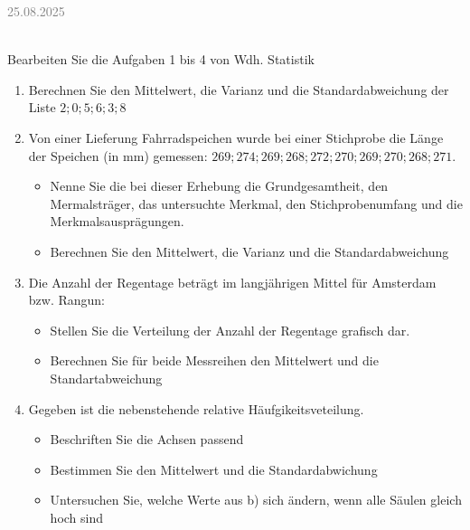 \documentclass[11pt,a4paper,oneside]{article}
\newcommand{\lessondate}[1]{
	\noindent\hfill\textcolor{gray}{\textsc{#1}} \\
	\vspace{0.5cm}
}
\begin{document}
	\newpage 
	\lessondate{25.08.2025}\\
	
	\begin{aufgabe}{Bearbeiten Sie die Aufgaben 1 bis 4 von Wdh. Statistik}
		\begin{enumerate}
			\item Berechnen Sie den Mittelwert, die Varianz und die Standardabweichung der Liste ${2; 0; 5; 6; 3; 8}$
			\item Von einer Lieferung Fahrradspeichen wurde bei einer Stichprobe die Länge der Speichen (in mm) gemessen: ${269; 274; 269; 268; 272; 270; 269; 270; 268; 271}$. 
			\begin{itemize}
				\item Nenne Sie die bei dieser Erhebung die Grundgesamtheit, den Mermalsträger, das untersuchte Merkmal, den Stichprobenumfang und die Merkmalsausprägungen. 
				\item Berechnen Sie den Mittelwert, die Varianz und die Standardabweichung 
			\end{itemize}
			\item Die Anzahl der Regentage beträgt im langjährigen Mittel für Amsterdam bzw. Rangun: 
			\begin{itemize}
				\item Stellen Sie die Verteilung der Anzahl der Regentage grafisch dar. 
				\item Berechnen Sie für beide Messreihen den Mittelwert und die Standartabweichung
			\end{itemize}
			\item Gegeben ist die nebenstehende relative Häufgikeitsveteilung.
			\begin{itemize}
				\item Beschriften Sie die Achsen passend 
				\item Bestimmen Sie den Mittelwert und die Standardabwichung 
				\item Untersuchen Sie, welche Werte aus b) sich ändern, wenn alle Säulen gleich hoch sind
			\end{itemize}
		\end{enumerate}
	\end{aufgabe}
	
	\newpage
	
\end{document}
